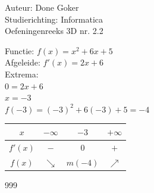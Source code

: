 \documentclass[a4paper]{article}
\begin{document}
  
\noindent \large Auteur: Done Goker \\
\noindent \large Studierichting: Informatica\\
\noindent \large Oefeningenreeks 3D nr. 2.2\\

\medskip

\normalsize


Functie: $f(x) = x^2 + 6x + 5$ \\

Afgeleide: $f'(x) = 2x + 6$ \\

Extrema: \\

$0 = 2x + 6$ \\

$x = -3$ \\

$f(-3) = (-3)^2 + 6(-3) + 5 = -4$ \\




\begin{tabular}{c|ccc}
        $x$     & $-\infty$ & $-3$ & $+\infty$\\ 
        \hline
        $f'(x)$ & $-$       & $0$ & $+$        \\ 
        \hline
        $f(x)$  &$\searrow$ &$m(-4)$ & $\nearrow$ \\
\end{tabular}
  
    

\begin{thebibliography}{999}
\end{thebibliography}
\end{document}
